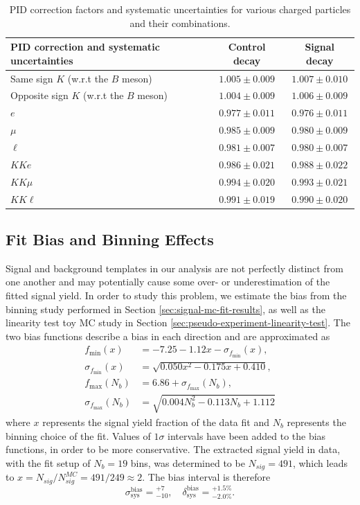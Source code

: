 \begin{table}[H]
	\centering
	\begin{tabular}{l|c|c}
		PID correction and systematic uncertainties & Control decay & Signal decay \\
		\toprule
		Same sign $K$ (w.r.t the $B$ meson) & $1.005\pm 0.009$ & $1.007\pm 0.010$\\
		Opposite sign $K$ (w.r.t the $B$ meson) & $1.004\pm 0.009$ & $1.006\pm 0.009$\\
		$e$ & $0.977\pm 0.011$ & $0.976\pm 0.011$\\
		$\mu$ & $0.985\pm 0.009$ & $0.980\pm 0.009$\\
		$\ell$ & $0.981\pm 0.007$ & $0.980\pm 0.007$\\
		\midrule
		$KKe$ & $0.986 \pm 0.021$ & $0.988\pm 0.022$\\
		$KK\mu$ & $0.994 \pm 0.020$ & $0.993\pm 0.021$\\
		\midrule
		$KK\ell$ & $0.991 \pm 0.019$ & $0.990\pm 0.020$\\
		\bottomrule
	\end{tabular}
	\captionsetup{width=0.8\linewidth}
	\caption{PID correction factors and systematic uncertainties for various charged particles and their combinations.}
	\label{tab:PID}
\end{table}

\subsection{Fit Bias and Binning Effects}
Signal and background templates in our analysis are not perfectly distinct from one another and may potentially cause some over- or underestimation of the fitted signal yield. In order to study this problem, we estimate the bias from the binning study performed in Section \ref{sec:signal-mc-fit-results}, as well as the linearity test toy MC study in Section \ref{sec:pseudo-experiment-linearity-test}. The two bias functions describe a bias in each direction and are approximated as
\begin{align}
f_{\mathrm{min}}(x) &= -7.25-1.12x - \sigma_{f_{\mathrm{min}}}(x), \\
\sigma_{f_{\mathrm{min}}}(x) &= \sqrt{0.050 x^2 - 0.175 x + 0.410}, \\
f_{\mathrm{max}}(N_b) &= 6.86 + \sigma_{f_{\mathrm{max}}}(N_b), \\
\sigma_{f_{\mathrm{max}}}(N_b) &= \sqrt{0.004N_b^2 - 0.113 N_b + 1.112}
\end{align}
where $x$ represents the signal yield fraction of the data fit and $N_b$ represents the binning choice of the fit. Values of $1\sigma$ intervals have been added to the bias functions, in order to be more conservative. The extracted signal yield in data, with the fit setup of $N_b=19$ bins, was determined to be $N_{sig} = 491$, which leads to $x = N_{sig} / N_{sig}^{MC} = 491 / 249 \approx 2$. The bias interval is therefore
\begin{equation}
\sigma_{\mathrm{sys}}^{\mathrm{bias}} = {}^{+7}_{-10},\quad \delta_{\mathrm{sys}}^{\mathrm{bias}} = {}^{+1.5\%}_{-2.0\%}.
\end{equation}

